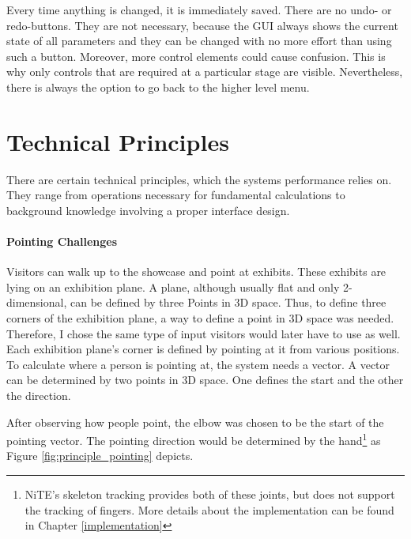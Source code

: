 Every time anything is changed, it is immediately saved. There are no undo- or redo-buttons. They are not necessary, because the \ac{GUI} always shows the current state of all parameters and they can be changed with no more effort than using such a button. Moreover, more control elements could cause confusion. This is why only controls that are required at a particular stage are visible. Nevertheless, there is always the option to go back to the higher level menu.


\section{Technical Principles}
\label{installation_tech}

There are certain technical principles, which the systems performance relies on. They range from operations necessary for fundamental calculations to background knowledge involving a proper interface design.


\paragraph{Pointing Challenges}

Visitors can walk up to the showcase and point at exhibits. These exhibits are lying on an exhibition plane. A plane, although usually flat and only 2-dimensional, can be defined by three Points in \ac{3D} space. Thus, to define three corners of the exhibition plane, a way to define a point in \ac{3D} space was needed. Therefore, I chose the same type of input visitors would later have to use as well. Each exhibition plane's corner is defined by pointing at it from various positions. To calculate where a person is pointing at, the system needs a vector. A vector can be determined by two points in \ac{3D} space. One defines the start and the other the direction.

After observing how people point, the elbow was chosen to be the start of the pointing vector. The pointing direction would be determined by the hand\footnote{NiTE's skeleton tracking provides both of these joints, but does not support the tracking of fingers. More details about the implementation can be found in Chapter \ref{implementation}} as Figure \ref{fig:principle_pointing} depicts.


